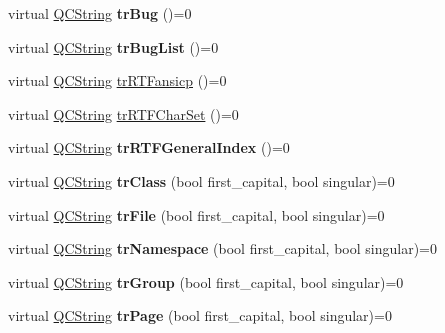 \begin{DoxyCompactItemize}
virtual \mbox{\hyperlink{class_q_c_string}{Q\+C\+String}} {\bfseries tr\+Bug} ()=0
\item 
\mbox{\label{class_translator_a904e5e013c7329eb66fd98bc6709d4d5}} 
virtual \mbox{\hyperlink{class_q_c_string}{Q\+C\+String}} {\bfseries tr\+Bug\+List} ()=0
\item 
virtual \mbox{\hyperlink{class_q_c_string}{Q\+C\+String}} \mbox{\hyperlink{class_translator_a9953a4c0e6a4fc7d017abcd5c2939e0f}{tr\+R\+T\+Fansicp}} ()=0
\item 
virtual \mbox{\hyperlink{class_q_c_string}{Q\+C\+String}} \mbox{\hyperlink{class_translator_afad391f3cbfb5ce6332b7239f8e2049a}{tr\+R\+T\+F\+Char\+Set}} ()=0
\item 
\mbox{\label{class_translator_a023a76a06189f153d11dc150c664fbd8}} 
virtual \mbox{\hyperlink{class_q_c_string}{Q\+C\+String}} {\bfseries tr\+R\+T\+F\+General\+Index} ()=0
\item 
\mbox{\label{class_translator_a887fa58ae73ee4585bd9d89359049196}} 
virtual \mbox{\hyperlink{class_q_c_string}{Q\+C\+String}} {\bfseries tr\+Class} (bool first\+\_\+capital, bool singular)=0
\item 
\mbox{\label{class_translator_adcedc68246e92cc1e7e3c6e5a457acba}} 
virtual \mbox{\hyperlink{class_q_c_string}{Q\+C\+String}} {\bfseries tr\+File} (bool first\+\_\+capital, bool singular)=0
\item 
\mbox{\label{class_translator_a4a3ca0198450342adb8599f00531a881}} 
virtual \mbox{\hyperlink{class_q_c_string}{Q\+C\+String}} {\bfseries tr\+Namespace} (bool first\+\_\+capital, bool singular)=0
\item 
\mbox{\label{class_translator_a3e440062dda08d55c8f9f99d572f6af0}} 
virtual \mbox{\hyperlink{class_q_c_string}{Q\+C\+String}} {\bfseries tr\+Group} (bool first\+\_\+capital, bool singular)=0
\item 
\mbox{\label{class_translator_a6cf8494079dacb3504df0b71f1bd62f8}} 
virtual \mbox{\hyperlink{class_q_c_string}{Q\+C\+String}} {\bfseries tr\+Page} (bool first\+\_\+capital, bool singular)=0
\item 
\mbox{\label{class_translator_aa8a315987247035ab2aed48303716535}} 

\end{DoxyCompactItemize}
